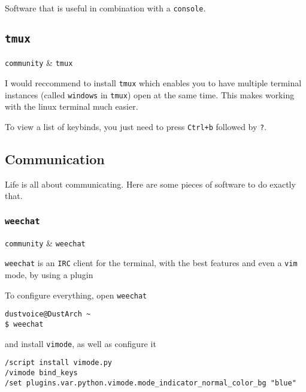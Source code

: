 \documentclass[10pt]{dustdoc}
\begin{document}
Software that is useful in combination with a \texttt{console}.

\subsection{\texttt{tmux}}
\label{sec:tmux}

\begin{packagetable}
    \texttt{community} & \texttt{tmux} \\ 
\end{packagetable}

I would reccommend to install \texttt{tmux} which enables you to have multiple terminal instances (called \texttt{windows} in \texttt{tmux}) open at the same time.
This makes working with the linux terminal much easier.

\begin{NOTE}
    To view a list of keybinds, you just need to press \texttt{Ctrl+\allowbreak{}b} followed by \texttt{?}.
\end{NOTE}

\subsection{Communication}
\label{sec:console-communication}

Life is all about communicating.
Here are some pieces of software to do exactly that.

\subsubsection{\texttt{weechat}}
\label{sec:weechat}

\begin{packagetable}
    \texttt{community} & \texttt{weechat} \\ 
\end{packagetable}

\texttt{weechat} is an \texttt{IRC} client for the terminal, with the best features and even a \texttt{vim} mode, by using a plugin

To configure everything, open \texttt{weechat}

\begin{verbatim}
dustvoice@DustArch ~
$ weechat
\end{verbatim}

\noindent
and install \texttt{vimode}, as well as configure it

\begin{verbatim}
/script install vimode.py
/vimode bind_keys
/set plugins.var.python.vimode.mode_indicator_normal_color_bg "blue"
\end{verbatim}
\end{document}
